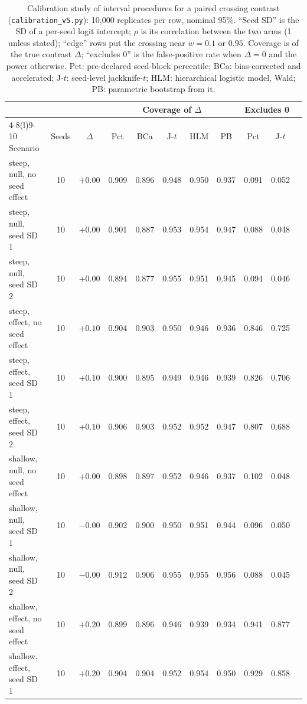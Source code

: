 \begin{table}[H]
\caption{Calibration study of interval procedures for a paired crossing contrast (\texttt{calibration\_v5.py}): 10,000 replicates per row, nominal 95\%. ``Seed SD'' is the SD of a per-seed logit intercept; $\rho$ is its correlation between the two arms (1 unless stated); ``edge'' rows put the crossing near $w=0.1$ or $0.95$. Coverage is of the true contrast $\Delta$; ``excludes 0'' is the false-positive rate when $\Delta=0$ and the power otherwise. Pct: pre-declared seed-block percentile; BCa: bias-corrected and accelerated; J-$t$: seed-level jackknife-$t$; HLM: hierarchical logistic model, Wald; PB: parametric bootstrap from it.}
\label{tab:calibration}
\centering\scriptsize\setlength{\tabcolsep}{3pt}
\begin{tabular}{@{}lcccccccccc@{}}
\toprule
& & & \multicolumn{5}{c}{Coverage of $\Delta$} & \multicolumn{2}{c}{Excludes 0} \\
\cmidrule(lr){4-8}\cmidrule(l){9-10}
Scenario & Seeds & $\Delta$ & Pct & BCa & J-$t$ & HLM & PB & Pct & J-$t$ \\
\midrule
steep, null, no seed effect & 10 & $+0.00$ & 0.909 & 0.896 & 0.948 & 0.950 & 0.937 & 0.091 & 0.052 \\
steep, null, seed SD 1 & 10 & $+0.00$ & 0.901 & 0.887 & 0.953 & 0.954 & 0.947 & 0.088 & 0.048 \\
steep, null, seed SD 2 & 10 & $+0.00$ & 0.894 & 0.877 & 0.955 & 0.951 & 0.945 & 0.094 & 0.046 \\
steep, effect, no seed effect & 10 & $+0.10$ & 0.904 & 0.903 & 0.950 & 0.946 & 0.936 & 0.846 & 0.725 \\
steep, effect, seed SD 1 & 10 & $+0.10$ & 0.900 & 0.895 & 0.949 & 0.946 & 0.939 & 0.826 & 0.706 \\
steep, effect, seed SD 2 & 10 & $+0.10$ & 0.906 & 0.903 & 0.952 & 0.952 & 0.947 & 0.807 & 0.688 \\
shallow, null, no seed effect & 10 & $+0.00$ & 0.898 & 0.897 & 0.952 & 0.946 & 0.937 & 0.102 & 0.048 \\
shallow, null, seed SD 1 & 10 & $-0.00$ & 0.902 & 0.900 & 0.950 & 0.951 & 0.944 & 0.096 & 0.050 \\
shallow, null, seed SD 2 & 10 & $-0.00$ & 0.912 & 0.906 & 0.955 & 0.955 & 0.956 & 0.088 & 0.045 \\
shallow, effect, no seed effect & 10 & $+0.20$ & 0.899 & 0.896 & 0.946 & 0.939 & 0.934 & 0.941 & 0.877 \\
shallow, effect, seed SD 1 & 10 & $+0.20$ & 0.904 & 0.904 & 0.952 & 0.954 & 0.950 & 0.929 & 0.858 \\

\end{tabular}
\end{table}
